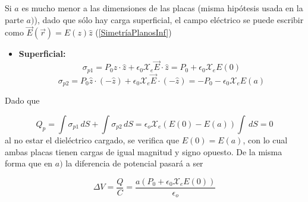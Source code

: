 \begin{solucion}{5}
Si $a$ es mucho menor a las dimensiones de las placas (misma hipótesis usada en la parte $a)$), dado que sólo hay carga superficial, el campo eléctrico se puede escribir como $\Vec{E}(\Vec{r}) = E(z)\hat{z}$ (\ref{SimetríaPlanosInf})

    \begin{itemize}
        \item \textbf{Superficial:}
        \[\sigma_{p1} = P_0\hat{z}\cdot\hat{z} + \epsilon_0\mathcal{X}_e\Vec{E}\cdot\hat{z} =P_0 + \epsilon_0\mathcal{X}_eE(0)\]
        \[\sigma_{p2} = P_0\hat{z}\cdot(-\hat{z})+ \epsilon_0\mathcal{X}_e\Vec{E}\cdot(-\hat{z}) = -P_0  -\epsilon_0\mathcal{X}_eE(a)\]
    \end{itemize}

Dado que

\[Q_p = \int\sigma_{p1}\,dS+\int\sigma_{p2}\,dS=\epsilon_o
\mathcal{X}_e(E(0)-E(a))\int\,dS=0\]
\bigbreak
al no estar el dieléctrico cargado, se verifica que $E(0)=E(a)$, con lo cual ambas placas tienen cargas de igual magnitud y signo opuesto. De la misma forma que en $a)$ la diferencia de potencial pasará a ser 

\[\Delta V=\frac{Q}{C}=\frac{a(P_0 + \epsilon_0\mathcal{X}_eE(0))}{\epsilon_o}\]

\end{solucion}


